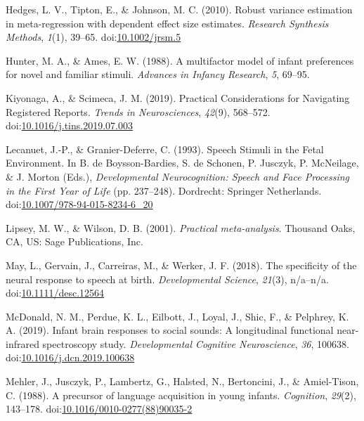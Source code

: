 \documentclass[man,floatsintext]{apa6}
\begin{document}
\hypertarget{ref-hedges_robust_2010}{}
Hedges, L. V., Tipton, E., \& Johnson, M. C. (2010). Robust variance
estimation in meta-regression with dependent effect size estimates.
\emph{Research Synthesis Methods}, \emph{1}(1), 39--65.
doi:\href{https://doi.org/10.1002/jrsm.5}{10.1002/jrsm.5}

\hypertarget{ref-hunter_multifactor_1988}{}
Hunter, M. A., \& Ames, E. W. (1988). A multifactor model of infant
preferences for novel and familiar stimuli. \emph{Advances in Infancy
Research}, \emph{5}, 69--95.

\hypertarget{ref-kiyonaga_practical_2019}{}
Kiyonaga, A., \& Scimeca, J. M. (2019). Practical Considerations for
Navigating Registered Reports. \emph{Trends in Neurosciences},
\emph{42}(9), 568--572.
doi:\href{https://doi.org/10.1016/j.tins.2019.07.003}{10.1016/j.tins.2019.07.003}

\hypertarget{ref-lecanuet_speech_1993}{}
Lecanuet, J.-P., \& Granier-Deferre, C. (1993). Speech Stimuli in the
Fetal Environment. In B. de Boysson-Bardies, S. de Schonen, P. Jusczyk,
P. McNeilage, \& J. Morton (Eds.), \emph{Developmental Neurocognition:
Speech and Face Processing in the First Year of Life} (pp. 237--248).
Dordrecht: Springer Netherlands.
doi:\href{https://doi.org/10.1007/978-94-015-8234-6_20}{10.1007/978-94-015-8234-6\_20}

\hypertarget{ref-lipsey_practical_2001}{}
Lipsey, M. W., \& Wilson, D. B. (2001). \emph{Practical meta-analysis}.
Thousand Oaks, CA, US: Sage Publications, Inc.

\hypertarget{ref-may_specificity_2018}{}
May, L., Gervain, J., Carreiras, M., \& Werker, J. F. (2018). The
specificity of the neural response to speech at birth.
\emph{Developmental Science}, \emph{21}(3), n/a--n/a.
doi:\href{https://doi.org/10.1111/desc.12564}{10.1111/desc.12564}

\hypertarget{ref-mcdonald_infant_2019}{}
McDonald, N. M., Perdue, K. L., Eilbott, J., Loyal, J., Shic, F., \&
Pelphrey, K. A. (2019). Infant brain responses to social sounds: A
longitudinal functional near-infrared spectroscopy study.
\emph{Developmental Cognitive Neuroscience}, \emph{36}, 100638.
doi:\href{https://doi.org/10.1016/j.dcn.2019.100638}{10.1016/j.dcn.2019.100638}

\hypertarget{ref-mehler_precursor_1988}{}
Mehler, J., Jusczyk, P., Lambertz, G., Halsted, N., Bertoncini, J., \&
Amiel-Tison, C. (1988). A precursor of language acquisition in young
infants. \emph{Cognition}, \emph{29}(2), 143--178.
doi:\href{https://doi.org/10.1016/0010-0277(88)90035-2}{10.1016/0010-0277(88)90035-2}
\end{document}
